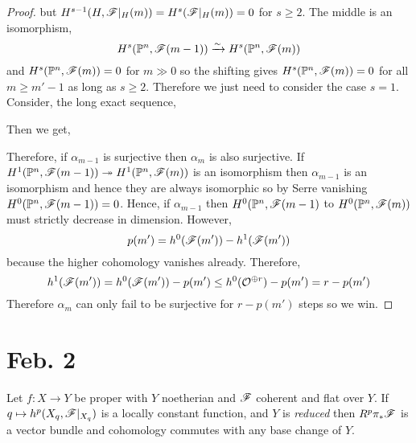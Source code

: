\documentclass[12pt]{article}
\begin{document}
\begin{proof}
but $H^{s-1}(H, \mathscr{F}|_H(m)) = H^s(\mathscr{F}|_H(m)) = 0$ for $s \ge 2$. The middle is an isomorphism,
\[  H^s(\mathbb{P}^n, \mathscr{F}(m-1)) \xrightarrow{\sim} H^s(\mathbb{P}^n, \mathscr{F}(m)) \] and $H^s(\mathbb{P}^n, \mathscr{F}(m)) = 0$ for $m \gg 0$ so the shifting gives $H^s(\mathbb{P}^n, \mathscr{F}(m)) = 0$ for all $m \ge m' - 1$ as long as $s \ge 2$. Therefore we just need to consider the case $s = 1$. Consider, the long exact sequence,
\begin{center}
\end{center}
Then we get,
\begin{center}
\end{center}
Therefore, if $\alpha_{m-1}$ is surjective then $\alpha_m$ is also surjective. If $H^1(\mathbb{P}^n, \mathscr{F}(m-1)) \twoheadrightarrow H^1(\mathbb{P}^n, \mathscr{F}(m))$ is an isomorphism then $\alpha_{m-1}$ is an isomorphism and hence they are always isomorphic so by Serre vanishing $H^0(\mathbb{P}^n, \mathscr{F}(m-1)) = 0$. Hence, if $\alpha_{m-1}$ then $H^0(\mathbb{P}^n, \mathscr{F}(m-1)$ to $H^0(\mathbb{P}^n, \mathscr{F}(m))$ must strictly decrease in dimension. However,
\[ p(m') = h^0(\mathscr{F}(m')) - h^1(\mathscr{F}(m')) \]
because the higher cohomology vanishes already. Therefore,
\[ h^1(\mathscr{F}(m')) = h^0(\mathscr{F}(m')) - p(m') \le h^0(\mathcal{O}_{}^{\oplus r}) - p(m') = r - p(m') \]
Therefore $\alpha_m$ can only fail to be surjective for $r - p(m')$ steps so we win. 
\end{proof}

\section{Feb. 2}

\begin{thm}[Grauert]
Let $f : X \to Y$ be proper with $Y$ noetherian and $\mathscr{F}$ coherent and flat over $Y$. If $q \mapsto h^p(X_q, \mathscr{F}|_{X_q})$ is a locally constant function, and $Y$ is \textit{reduced} then $R^p \pi_* \mathscr{F}$ is a vector bundle and cohomology commutes with any base change of $Y$.
\end{thm}
\end{document}

